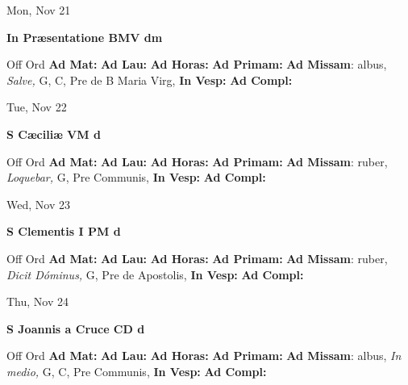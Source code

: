 \documentclass[10pt]{memoir}
\begin{document}
\begin{center}
\begin{minipage}{3.5in}
\vspace{2em}
\begin{center}Mon, Nov 21
\end{center}
\textbf{ \large In Præsentatione BMV
\textnormal{\normalsize dm}}

\begin{justify}Off Ord
\textbf{Ad Mat: }
\textbf{Ad Lau: }
\textbf{Ad Horas: }
\textbf{Ad Primam: }\textbf{Ad Missam}: albus, \textit{Salve,} G, C, Pre de B Maria Virg, 
\textbf{In Vesp: }
\textbf{Ad Compl: }
\end{justify}
\end{minipage}
\end{center}

\begin{center}
\begin{minipage}{3.5in}
\vspace{2em}
\begin{center}Tue, Nov 22
\end{center}
\textbf{ \large S Cæciliæ VM
\textnormal{\normalsize d}}

\begin{justify}Off Ord
\textbf{Ad Mat: }
\textbf{Ad Lau: }
\textbf{Ad Horas: }
\textbf{Ad Primam: }\textbf{Ad Missam}: ruber, \textit{Loquebar,} G, Pre Communis, 
\textbf{In Vesp: }
\textbf{Ad Compl: }
\end{justify}
\end{minipage}
\end{center}

\begin{center}
\begin{minipage}{3.5in}
\vspace{2em}
\begin{center}Wed, Nov 23
\end{center}
\textbf{ \large S Clementis I PM
\textnormal{\normalsize d}}

\begin{justify}Off Ord
\textbf{Ad Mat: }
\textbf{Ad Lau: }
\textbf{Ad Horas: }
\textbf{Ad Primam: }\textbf{Ad Missam}: ruber, \textit{Dicit Dóminus,} G, Pre de Apostolis, 
\textbf{In Vesp: }
\textbf{Ad Compl: }
\end{justify}
\end{minipage}
\end{center}

\begin{center}
\begin{minipage}{3.5in}
\vspace{2em}
\begin{center}Thu, Nov 24
\end{center}
\textbf{ \large S Joannis a Cruce CD
\textnormal{\normalsize d}}

\begin{justify}Off Ord
\textbf{Ad Mat: }
\textbf{Ad Lau: }
\textbf{Ad Horas: }
\textbf{Ad Primam: }\textbf{Ad Missam}: albus, \textit{In medio,} G, C, Pre Communis, 
\textbf{In Vesp: }
\textbf{Ad Compl: }
\end{justify}
\end{minipage}
\end{center}
\end{document}
